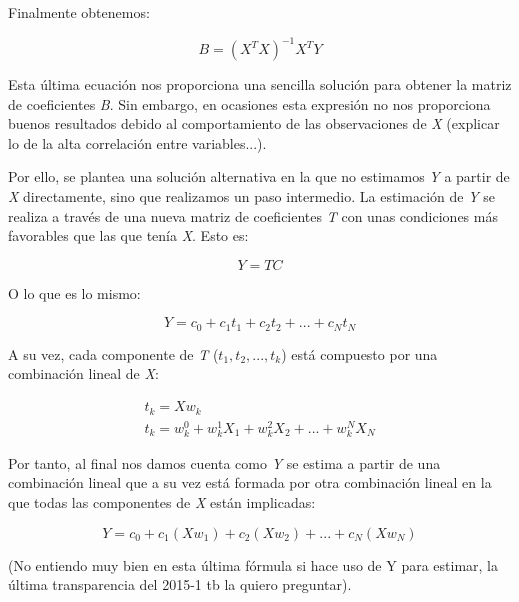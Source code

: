 \documentclass[12pt,a4paper,Spanish]{book}
\begin{document}
Finalmente obtenemos: 

\begin{equation}
B = (X^{T} X)^{-1} X^{T} Y
\end{equation}

Esta última ecuación nos proporciona una sencilla solución para obtener la matriz de coeficientes \textit{B}. Sin embargo, en ocasiones esta expresión no nos proporciona buenos resultados debido al comportamiento de las observaciones de \textit{X} (explicar lo de la alta correlación entre variables...).

Por ello, se plantea una solución alternativa en la que no estimamos \textit{Y} a partir de \textit{X} directamente, sino que realizamos un paso intermedio. La estimación de \textit{Y} se realiza a través de una nueva matriz de coeficientes \textit{T} con unas condiciones más favorables que las que tenía \textit{X}. Esto es:

\begin{equation}
Y = TC
\end{equation}

O lo que es lo mismo:

\begin{equation}
Y = c_0 + c_1t_1 + c_2t_2 + ... + c_Nt_N
\end{equation}

A su vez, cada componente de \textit{T} ($t_1, t_2,..., t_k$) está compuesto por una combinación lineal de \textit{X}:

\begin{equation}
\begin{split} 
t_k = X w_k \\
t_k = w_k^0 + w_k^1 X_1 + w_k^2 X_2 + ... + w_k^N X_N
\end{split} 
\end{equation}

Por tanto, al final nos damos cuenta como \textit{Y} se estima a partir de una combinación lineal que a su vez está formada por otra combinación lineal en la que todas las componentes de \textit{X} están implicadas:

\begin{equation}
Y = c_0 + c_1(X w_1) + c_2(X w_2) + ... + c_N(X w_N)  
\end{equation}

(No entiendo muy bien en esta última fórmula si hace uso de Y para estimar, la última transparencia del 2015-1 tb la quiero preguntar).
\end{document}
